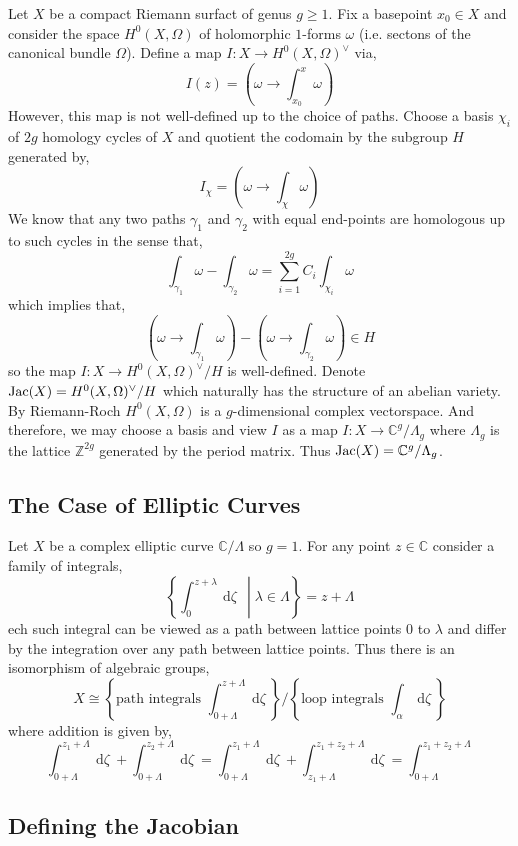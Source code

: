 \documentclass{article}
\newcommand{\Z}{\mathbb{Z}}
\newcommand{\C}{\mathbb{C}}
\renewcommand{\d}[1]{\: \mathrm{d}#1 \:}
\theoremstyle{definition}
\begin{document}
Let $X$ be a compact Riemann surfact of genus $g \ge 1$. Fix a basepoint $x_0 \in X$ and consider the space $H^0(X, \Omega)$ of holomorphic $1$-forms $\omega$ (i.e. sectons of the canonical bundle $\Omega$). Define a map $I : X \to H^0(X, \Omega)^\vee$ via,
\[ I(z) = \left( \omega \to \int_{x_0}^x \omega \right) \]
However, this map is not well-defined up to the choice of paths. Choose a basis $\chi_i$ of $2g$ homology cycles of $X$ and quotient the codomain by the subgroup $H$ generated by,
\[ I_\chi = \left( \omega \to \int_\chi \omega \right) \]
We know that any two paths $\gamma_1$ and $\gamma_2$ with equal end-points are homologous up to such cycles in the sense that,
\[ \int_{\gamma_1} \omega - \int_{\gamma_2} \omega = \sum_{i = 1}^{2g} C_i \int_{\chi_i} \omega \]
which implies that,
\[ \left( \omega \to \int_{\gamma_1} \omega \right) - \left( \omega \to \int_{\gamma_2} \omega \right) \in H \]
so the map $I : X \to H^0(X, \Omega)^\vee / H$ is well-defined. Denote $\mathrm{Jac}(X) = H^0(X, \Omega)^\vee / H$ which naturally has the structure of an abelian variety.
\bigskip\\
By Riemann-Roch $H^0(X, \Omega)$ is a $g$-dimensional complex vectorspace. And therefore, we may choose a basis and view $I$ as a map $I : X \to \C^g / \Lambda_g$ where $\Lambda_g$ is the lattice $\Z^{2g}$ generated by the period matrix. Thus $\Jac{X} = \C^g / \Lambda_g$.

\subsection{The Case of Elliptic Curves}

Let $X$ be a complex elliptic curve $\C / \Lambda$ so $g = 1$. For any point $z \in \C$ consider a family of integrals,
\[ \left\{ \int_0^{z + \lambda} \d{\zeta} \: \middle| \lambda \in \Lambda \right\} = z + \Lambda \] 
ech such integral can be viewed as a path between lattice points $0$ to $\lambda$ and differ by the integration over any path between lattice points. Thus there is an isomorphism of algebraic groups,
\[ X \cong \left\{ \text{path integrals } \int_{0 + \Lambda}^{z + \Lambda} \d{\zeta} \right\} \Bigg/ \left\{ \text{loop integrals } \int_\alpha \d{\zeta} \right\} \]
where addition is given by,
\[ \int_{0 + \Lambda}^{z_1 + \Lambda} \d{\zeta} + \int_{0 + \Lambda}^{z_2 + \Lambda} \d{\zeta} = \int_{0 + \Lambda}^{z_1 + \Lambda} \d{\zeta} + \int_{z_1 + \Lambda}^{z_1 + z_2  + \Lambda} \d{\zeta} = \int_{0 + \Lambda}^{z_1 + z_2 + \Lambda} \]

\subsection{Defining the Jacobian}
\end{document}
